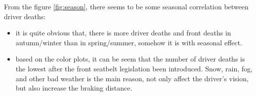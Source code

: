 \documentclass[11pt,a4paper,]{article}
\begin{document}
From the figure \ref{fig:season}, there seems to be some seasonal correlation between driver deaths:

\begin{itemize}
\item
  it is quite obvious that, there is more driver deaths and front deaths in autumn/winter than in spring/summer, somehow it is with seasonal effect.
\item
  based on the color plots, it can be seem that the number of driver deaths is the lowest after the front seatbelt legislation been introduced. Snow, rain, fog, and other bad weather is the main reason, not only affect the driver's vision, but also increase the braking distance.
\end{itemize}

\printbibliography
\end{document}
